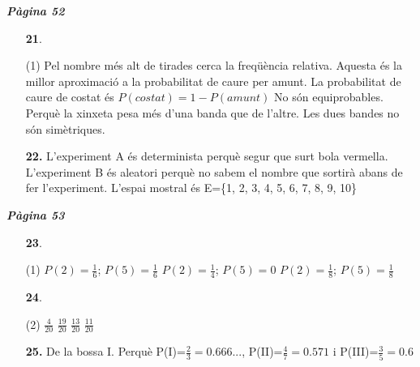 \documentclass[a4paper, pdf, twoside]{book}
\begin{document}
\begin{multicols}{2}

{\textbf{\em Pàgina 52}} \hrulefill
\begin{enumerate}
\vspace{0.25cm}



 \item[\fontfamily{phv}\selectfont\color{blue}\textbf{21}. ] 
 \begin{tasks}[column-sep=1em, item-indent=1.3333em](1)
	 \task Pel nombre més alt de tirades
	 \task* cerca la freqüència relativa. Aquesta és la millor aproximació a la probabilitat de caure per amunt. La probabilitat de caure de costat és $P(costat)=1-P(amunt)$
	 \task* No són equiprobables. Perquè la xinxeta pesa més d'una banda que de l'altre. Les dues bandes no són simètriques.
\end{tasks}
 \end{enumerate}
\begin{enumerate}
\vspace{0.25cm}
\item[\fontfamily{phv}\selectfont\color{blue}\textbf{22. }] 
L'experiment A és determinista perquè segur que surt bola vermella. L'experiment B és aleatori perquè no sabem el nombre que sortirà abans de fer l'experiment. L'espai mostral és E=\{1, 2, 3, 4, 5, 6, 7, 8, 9, 10\}
 \end{enumerate}
\vspace{0.3cm}


{\textbf{\em Pàgina 53}} \hrulefill
\begin{enumerate}
\vspace{0.25cm}



 \item[\fontfamily{phv}\selectfont\color{blue}\textbf{23}. ] 
 \begin{tasks}[column-sep=1em, item-indent=1.3333em](1)
	 \task $P(2)=\frac {1}{6}$; $P(5)=\frac {1}{6}$
	 \task $P(2)=\frac {1}{4}$; $P(5)=0$
	 \task $P(2)=\frac {1}{8}$; $P(5)=\frac {1}{8}$
\end{tasks}
 \end{enumerate}
\begin{enumerate}
\vspace{0.25cm}



 \item[\fontfamily{phv}\selectfont\color{blue}\textbf{24}. ] 
 \begin{tasks}[column-sep=1em, item-indent=1.3333em](2)
	 \task $\frac {4}{20}$
	 \task $\frac {19}{20}$
	 \task $\frac {13}{20}$
	 \task $\frac {11}{20}$
\end{tasks}
\vspace{0.25cm}
\item[\fontfamily{phv}\selectfont\color{blue}\textbf{25. }] 
De la bossa I. Perquè P(I)=$\frac {2}{3}=0.666...$, P(II)=$\frac {4}{7}=0.571$ i P(III)=$\frac {3}{5}=0.6$
\vspace{0.25cm}



\end{enumerate}
\end{multicols}
\end{document}
